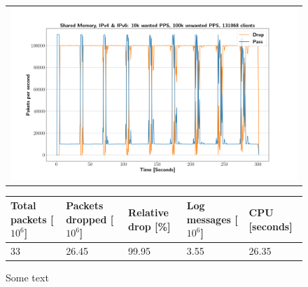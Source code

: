 \begin{figure}[p]
	\label{fig:simplefail2ban:shm:ip46:100k}
	\centering
	\scriptsize
	\begin{tabular}{c}
    	\centerline{\includegraphics[width=1.2\textwidth]{images/simplefail2ban_shm_ipv46_v10k_iv100k_c131068.png}}
	\end{tabular}
	\begin{tabular}{lllll}
		\toprule
		\textbf{Total packets [$10^6$]} & \textbf{Packets dropped [$10^6$]} & \textbf{Relative drop [\%]} & \textbf{Log messages [$10^6$]} & \textbf{CPU [seconds]} \\ \midrule 
		33 & 26.45 & 99.95 & 3.55 & 26.35 \\
		\bottomrule
	\end{tabular}
	\caption[Simplefail2ban, Shared Memory, IPv4 \& IPv6, 100k \ac{PPS}]{Some text}
\end{figure}

